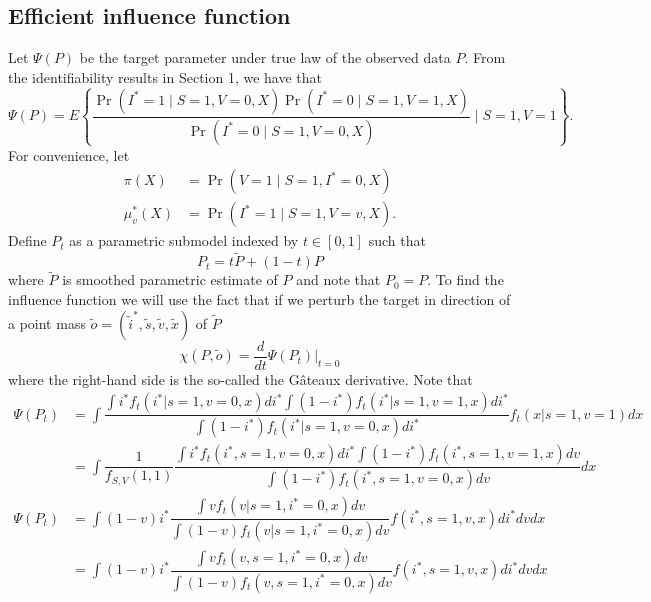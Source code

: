 \begin{appendix}
\begin{enumerate}
    \end{enumerate}
    \subsection{Efficient influence function}
    Let $\Psi(P)$ be the target parameter under true law of the observed data $P$. From the identifiability results in Section 1, we have that 
$$\Psi(P) = E\left\{\dfrac{\Pr(I^*=1\mid S=1, V=0, X)\Pr(I^*=0\mid S=1, V=1, X)}{\Pr(I^*=0\mid S=1, V=0, X)}\mid S=1, V=1\right\}.$$ 
For convenience, let
\begin{align*}
    \pi(X) &= \Pr(V=1\mid S=1, I^*=0, X) \\
    \mu^*_v(X) &= \Pr(I^*=1\mid S=1, V=v, X).
\end{align*}
Define $P_t$ as a parametric submodel indexed by $t \in [0,1]$ such that
$$P_t = t \widetilde{P} + (1 - t)P$$
where $\widetilde{P}$ is smoothed parametric estimate of $P$ and note that $P_0 = P$. To find the influence function we will use the fact that if we perturb the target in direction of a point mass $\widetilde{o} = (\widetilde{i}^*, \widetilde{s}, \widetilde{v}, \widetilde{x})$ of $\widetilde{P}$
$$ \chi(P, \widetilde{o}) = \frac{d}{dt} \Psi(P_t)\bigg\vert_{t=0}$$
where the right-hand side is the so-called the G\^{a}teaux derivative. Note that 
\begin{align*}
    \Psi(P_t) &= \int \dfrac{\int i^* f_t(i^* | s=1,v=0,x)di^* \int (1-i^*) f_t(i^* | s=1, v=1, x)di^*}{\int(1 - i^*) f_t(i^* | s=1, v=0, x)di^*}f_t(x|s=1,v=1)dx \\
    &= \int \dfrac{1}{f_{S,V}(1, 1)} \dfrac{\int i^* f_t(i^*, s=1,v=0,x)di^* \int (1 - i^*)  f_t(i^*, s=1, v=1, x)dv}{\int(1 - i^*)  f_t(i^*, s=1, v=0, x)dv}dx 
\end{align*}
\begin{align*}
    \Psi(P_t) &= \int (1 - v)i^*\dfrac{\int v f_t(v | s=1, i^*=0, x)dv}{\int (1-v) f_t(v | s=1, i^*=0, x)dv} f(i^*, s=1, v, x) di^* dv dx \\
    &= \int (1 - v)i^*\dfrac{\int v f_t(v, s=1, i^*=0, x)dv}{\int (1-v) f_t(v, s=1, i^*=0, x)dv} f(i^*, s=1, v, x) di^* dv dx
\end{align*}


\end{appendix}

